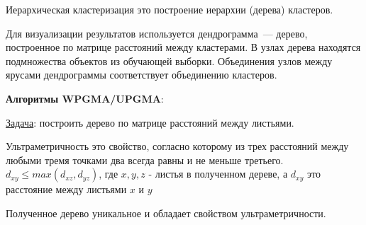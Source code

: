 
\begin{definition}
  Иерархическая кластеризация это построение иерархии (дерева) кластеров.
\end{definition}

Для визуализации результатов используется дендрограмма~--- дерево, построенное
по матрице расстояний между кластерами. В узлах дерева находятся подмножества
объектов из обучающей выборки. Объединения узлов между ярусами дендрограммы
соответствует объединению кластеров.

\textbf{Алгоритмы WPGMA/UPGMA}:

\underline{Задача}: построить дерево по матрице расстояний между листьями.

\begin{definition}
  Ультраметричность это свойство, согласно которому из трех расстояний между
  любыми тремя точками два всегда равны и не меньше третьего.
  $d_{xy} \leq max(d_{xz}, d_{yz})$, где $x, y, z$ - листья в полученном дереве, а $d_{xy}$ это расстояние между листьями $x$ и $y$
\end{definition}

\begin{remark}
  Полученное дерево уникальное и обладает свойством ультраметричности.
\end{remark}


